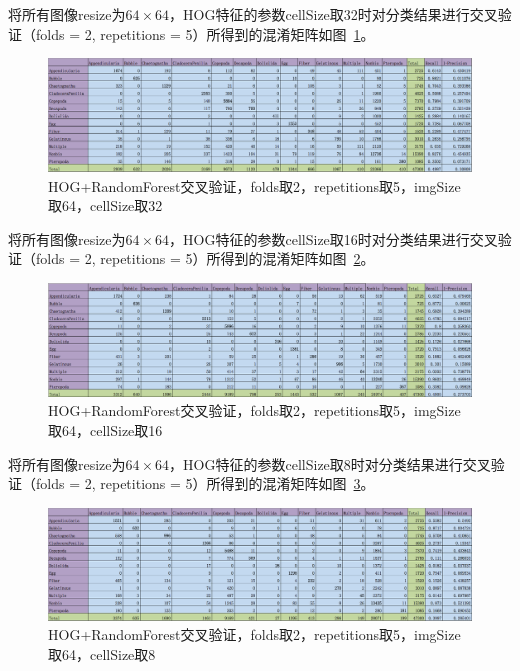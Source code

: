 \documentclass[12pt]{article}
\begin{document}
将所有图像resize为$64 \times 64$，HOG特征的参数cellSize取32时对分类结果进行交叉验证（folds = 2, repetitions = 5）所得到的混淆矩阵如图~\ref{fig: HOG-RF-2-folds-5-repetitions-32-64}。
\begin{figure}[!ht]
\centering
\includegraphics[width=1.0\linewidth]{HOG-RF-2-folds-5-repetitions-32-64}
\caption{HOG+RandomForest交叉验证，folds取2，repetitions取5，imgSize取64，cellSize取32}
\label{fig: HOG-RF-2-folds-5-repetitions-32-64}
\end{figure}

将所有图像resize为$64 \times 64$，HOG特征的参数cellSize取16时对分类结果进行交叉验证（folds = 2, repetitions = 5）所得到的混淆矩阵如图~\ref{fig: HOG-RF-2-folds-5-repetitions-16-64}。
\begin{figure}[!ht]
\centering
\includegraphics[width=1.0\linewidth]{HOG-RF-2-folds-5-repetitions-16-64}
\caption{HOG+RandomForest交叉验证，folds取2，repetitions取5，imgSize取64，cellSize取16}
\label{fig: HOG-RF-2-folds-5-repetitions-16-64}
\end{figure}

将所有图像resize为$64 \times 64$，HOG特征的参数cellSize取8时对分类结果进行交叉验证（folds = 2, repetitions = 5）所得到的混淆矩阵如图~\ref{fig: HOG-RF-2-folds-5-repetitions-8-64}。
\begin{figure}[!ht]
\centering
\includegraphics[width=1.0\linewidth]{HOG-RF-2-folds-5-repetitions-8-64}
\caption{HOG+RandomForest交叉验证，folds取2，repetitions取5，imgSize取64，cellSize取8}
\label{fig: HOG-RF-2-folds-5-repetitions-8-64}
\end{figure}
\end{document}
